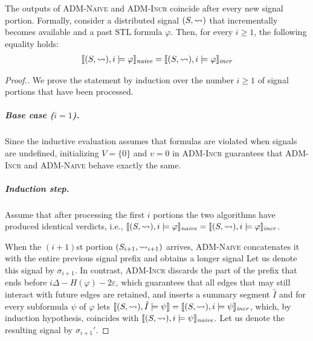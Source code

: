 \begin{theorem} \label{cl:algoOnline}
	The outputs of \textsc{ADM-Naive} and \textsc{ADM-Incr} coincide after every new signal portion.
	Formally, consider a distributed signal $(S,{\rightsquigarrow})$ that incrementally becomes available and a past STL formula $\varphi$.
	Then, for every $i \geq 1$, the following equality holds:
	\begin{align*}
		\llbracket (S, {\rightsquigarrow}), i \models \varphi \rrbracket_{\textit{naive}} = \llbracket (S, {\rightsquigarrow}), i \models \varphi \rrbracket_{\textit{incr}}
	\end{align*}
\end{theorem}
\begin{proof}[\normalsize Proof.]
	\normalsize
	We prove the statement by induction over the number $i \geq 1$ of signal portions that have been processed.
	
	\subparagraph*{Base case ($i = 1$).}
	Since the inductive evaluation assumes that formulas are violated when signals are undefined, initializing $V = \{0\}$ and $v=0$ in \textsc{ADM-Incr} guarantees that \textsc{ADM-Incr} and \textsc{ADM-Naive} behave exactly the same.
	
	
	\subparagraph*{Induction step.}
	Assume that after processing the first $i$ portions the two algorithms have
	produced identical verdicts, i.e., $ \llbracket (S,\rightsquigarrow), i \models \varphi \rrbracket_{\textit{naive}} = \llbracket (S,\rightsquigarrow), i \models \varphi \rrbracket_{\textit{incr}}$.
	
	When the $(i+1)$st portion $(S_{i+1},\rightsquigarrow_{i+1})$ arrives, \textsc{ADM-Naive} concatenates it with the entire previous signal prefix and obtains a longer signal
	Let us denote this signal by $\sigma_{i+1}$.
	In contrast, \textsc{ADM-Incr} discards the part of the prefix that ends before $i\Delta - H(\varphi) - 2\varepsilon$, which guarantees that all edges that may still interact with future edges are retained, and inserts a summary segment
	$\hat{I}$ and for every subformula $\psi$ of $\varphi$ lets $\llbracket (S,\rightsquigarrow), \hat{I} \models \psi \rrbracket = \llbracket (S,\rightsquigarrow), i \models \psi \rrbracket_{\textit{incr}}$, which, by induction hypothesis, coincides with $\llbracket (S,\rightsquigarrow), i \models \psi \rrbracket_{\textit{naive}}$.
	Let us denote the resulting signal by $\sigma_{i+1}'$.
	

\end{proof}
